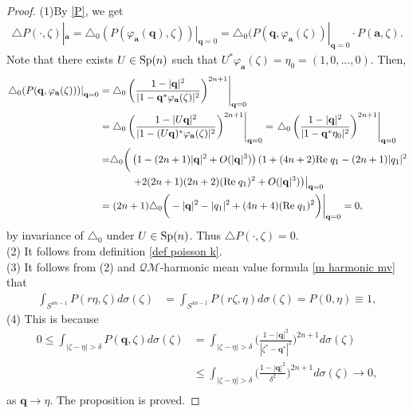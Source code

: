 \documentclass[a4paper,11pt]{amsart}
\numberwithin{equation}{section}
\begin{document}
\begin{proof}
(1)\;By \eqref{P}, we get
\begin{equation*}\begin{aligned}
\triangle P(\cdot,\zeta)|_{\mathbf{a}}=\left.\triangle_0 \left(P\left(\varphi_{\mathbf{a}}(\mathbf{q}),\zeta\right)\right)\right|_{\mathbf{q}=0}=\triangle_0 (P(\mathbf{q},\varphi_{\mathbf{a}}(\zeta))|_{\mathbf{q}=0}\cdot P(\mathbf{a},\zeta).
\end{aligned}\end{equation*}
Note that there exists $U\in{\rm Sp}(n)$ such that $U^*\varphi_{\mathbf{a}}(\zeta)=\eta_0=(1,0,\dots,0)$. Then,
\begin{equation*}\begin{aligned}
\left.\triangle_0 (P(\mathbf{q},\varphi_{\mathbf{a}}(\zeta)))\right|_{\mathbf{q}=0}=&\left.\triangle_0 \left(\frac{1-|\mathbf{q}|^2}{|1-\mathbf{q}^*\varphi_{\mathbf{a}}(\zeta)|^2}\right)^{2n+1}\right|_{\mathbf{q}=0}\\
=&\left.\triangle_0 \left(\frac{1-|U\mathbf{q}|^2}{|1-(U\mathbf{q})^*\varphi_{\mathbf{a}}(\zeta)|^2}\right)^{2n+1}\right|_{\mathbf{q}=0}=\left.\triangle_0 \left(\frac{1-|\mathbf{q}|^2}{|1-\mathbf{q}^*\eta_0|^2}\right)^{2n+1}\right|_{\mathbf{q}=0}\\
=&\triangle_0 \bigg(\left(1-(2n+1)|\mathbf{q}|^2+O(|\mathbf{q}|^3)\right)(1+(4n+2){\rm Re}\;q_1-(2n+1)|q_1|^2\bigg.\\
&\left.\left.\qquad+2(2n+1)(2n+2)({\rm Re}\;q_1)^2+O(|\mathbf{q}|^3)\right)\right|_{\mathbf{q}=0}\\
=&\left.(2n+1)\triangle_0\bigg(-|\mathbf{q}|^2-|q_1|^2+(4n+4)({\rm Re}\;q_1)^2\bigg)\right|_{\mathbf{q}=0}=0,
\end{aligned}\end{equation*}
by invariance of $\triangle_0$ under $U\in{\rm Sp}(n)$. Thus $\triangle P(\cdot,\zeta)=0$.\\
(2)
It follows from definition \eqref{def poisson k}.\\
(3) It follows from (2) and $\mathcal{QM}$-harmonic mean value formula \eqref{m harmonic mv} that
\begin{equation*}\begin{aligned}
\int_{S^{4n-1}}P(r\eta,\zeta)d\sigma(\zeta)&=\int_{S^{4n-1}}P(r\zeta,\eta)d\sigma(\zeta)=P(0,\eta)\equiv1,
\end{aligned}\end{equation*}
(4) This is because
\begin{equation*}\begin{aligned}
0\leq\int_{|\zeta-\eta|>\delta}P(\mathbf{q},\zeta)d\sigma(\zeta)&=\int_{|\zeta-\eta|>\delta}\bigg(\frac{1-|\mathbf{q}|^2}{|\zeta^*-\mathbf{q}^*|^2}\bigg)^{2n+1}d\sigma(\zeta)\\
&\leq\int_{|\zeta-\eta|>\delta}\bigg(\frac{1-|\mathbf{q}|^2}{\delta^2}\bigg)^{2n+1}d\sigma(\zeta)\rightarrow0,\\
\end{aligned}\end{equation*}
as $\mathbf{q}\rightarrow\eta$. The proposition is proved.
\end{proof}
\end{document}
